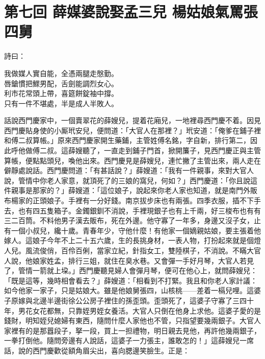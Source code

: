 
\chapter*{第七回 薛媒婆說娶孟三兒 楊姑娘氣罵張四舅}


詩曰：

\begin{myquote} 
我做媒人實自能，全憑兩腿走慇勤。\\唇鎗慣把鰥男配，舌劍能調烈女心。\\利市花常頭上帶，喜筵餅錠袖中撐。\\只有一件不堪處，半是成人半敗人。
\end{myquote} 

話說西門慶家中，一個賣翠花的薛嫂兒，提着花廂兒，一地裡尋西門慶不着。因見西門慶貼身使的小厮玳安兒，便問道：「大官人在那裡？」玳安道：「俺爹在鋪子裡和傅二叔算帳。」原來西門慶家開生藥鋪，主管姓傅名銘，字自新，排行第二，因此呼他做傅二叔。這薛嫂聽了，一直走到鋪子門首，掀開簾子，見西門慶正與主管算帳，便點點頭兒，喚他出來。西門慶見是薛嫂兒，連忙撇了主管出來，兩人走在僻靜處說話。西門慶問道：「有甚話說？」薛嫂道：「我有一件親事，來對大官人說，管情中你老人家意，就頂死了的三娘的窩兒，{}何如？」西門慶道：「你且說這件親事是那家的？」薛嫂道：「這位娘子，說起來你老人家也知道，就是南門外販布楊家的正頭娘子。手裡有一分好錢。南京拔步床也有兩張。四季衣服，插不下手去，也有四五隻箱子。金鐲銀釧不消說，手裡現銀子也有上千兩，好三梭布也有有三二百筒。不料他男子漢去販布，死在外邊。他守寡了一年多，身邊又沒子女，止有一個小叔兒，纔十歲。青春年少，守他什麼！有他家一個嫡親姑娘，要主張着他嫁人。這娘子今年不上二十五六歲，{}生的長挑身材，一表人物，打扮起來就是個燈人兒。風流俊俏，百伶百俐，當家立紀，針指女工，雙陸棋子，不消說。不瞞大官人說，{}他娘家姓孟，排行三姐，就住在臭水巷。{}又會彈一手好月琴，大官人若見了，管情一箭就上垜。」西門慶聽見婦人會彈月琴，便可在他心上，就問薛嫂兒：「既是這等，幾時相會看去？」薛嫂道：「相看到不打緊。我且和你老人家計議：{}如今他家一家子，只是姑娘大。雖是他娘舅張四，山核桃——差着一槅兒哩。這婆子原嫁與北邊半邊街徐公公房子裡住的孫歪頭。{}歪頭死了，這婆子守寡了三四十年，男花女花都無，只靠姪男姪女養活。大官人只倒在他身上求他。這婆子愛的是錢財，明知姪兒媳婦有東西，隨問什麼人家他也不管，只指望要幾兩銀子。大官人家裡有的是那囂段子，拏一段，買上一担禮物，明日親去見他，再許他幾兩銀子，一拳打倒他。{}隨問旁邊有人說話，這婆子一力張主，誰敢怎的！」這薛嫂兒一席話，說的西門慶歡從額角眉尖出，喜向腮邊笑臉生。正是：

